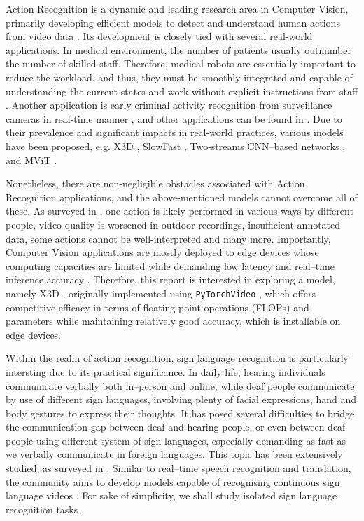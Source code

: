\label{sec:introduction}

Action Recognition is a dynamic and leading research area in Computer Vision, primarily developing efficient models to detect and understand human actions from video data \cite{HEO202632}.
Its development is closely tied with several real-world applications.
In medical environment, the number of patients usually outnumber the number of skilled staff.
Therefore, medical robots are essentially important to reduce the workload, and thus, they must be smoothly integrated and capable of understanding the current states and work without explicit instructions from staff \cite{Stabenow2026}.
Another application is early criminal activity recognition from surveillance cameras in real-time manner \cite{LIM2023}, and other applications can be found in \cite{HEO202632, KongFu2022}.
Due to their prevalence and significant impacts in real-world practices, various models have been proposed, e.g. X3D \cite{feichtenhofer2020x3d}, SlowFast \cite{feichtenhofer2019slowfast}, Two-streams CNN–based networks \cite{simonyan2014twostream}, and MViT \cite{fan2021mvit, li2022mvitv2}.

Nonetheless, there are non-negligible obstacles associated with Action Recognition applications, and the above-mentioned models cannot overcome all of these. As surveyed in \cite{HEO202632,KongFu2022}, one action is likely performed in various ways by different people,
video quality is worsened in outdoor recordings, insufficient annotated data, some actions cannot be well-interpreted and many more.
Importantly, Computer Vision applications are mostly deployed to edge devices whose computing capacities are limited while demanding low latency and real–time inference accuracy \cite{MoViNets, DeepRT}.
Therefore, this report is interested in exploring a model, namely X3D \cite{feichtenhofer2020x3d}, originally implemented using \texttt{PyTorchVideo} \cite{fan2021pytorchvideo}, which offers competitive efficacy in terms of floating point operations (FLOPs) and parameters while maintaining relatively good accuracy, which is installable on edge devices.

Within the realm of action recognition, sign language recognition is particularly intersting due to its practical significance.
In daily life, hearing individuals communicate verbally both in–person and online, while deaf people communicate by use of different sign languages, involving plenty of facial expressions, hand and body gestures to express their thoughts.
It has posed several difficulties to bridge the communication gap between deaf and hearing people, or even between deaf people using different system of sign languages, especially demanding as fast as we verbally communicate in foreign languages.
This topic has been extensively studied, as surveyed in \cite{RASTGOO2021113794}. Similar to real–time speech recognition and translation, the community aims to develop models capable of recognising continuous sign language videos \cite{Improving-Continuous-Sign-Language-Recognition}.
For sake of simplicity, we shall study isolated sign language recognition tasks \cite{Isolated-Sign-Language-Recognition}.

